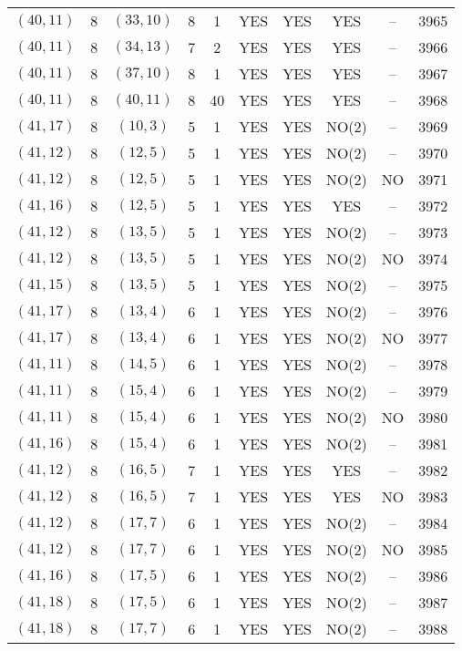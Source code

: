 \begin{longtable}{|c|c|c|c|c|c|c|c|c|c|}
$(40, 11)$ & 8 & $(33, 10)$ & 8 & 1 & YES & YES & YES & -- & 3965\\
$(40, 11)$ & 8 & $(34, 13)$ & 7 & 2 & YES & YES & YES & -- & 3966\\
$(40, 11)$ & 8 & $(37, 10)$ & 8 & 1 & YES & YES & YES & -- & 3967\\
$(40, 11)$ & 8 & $(40, 11)$ & 8 & 40 & YES & YES & YES & -- & 3968\\
$(41, 17)$ & 8 & $(10, 3)$ & 5 & 1 & YES & YES & NO(2) & -- & 3969\\
$(41, 12)$ & 8 & $(12, 5)$ & 5 & 1 & YES & YES & NO(2) & -- & 3970\\
$(41, 12)$ & 8 & $(12, 5)$ & 5 & 1 & YES & YES & NO(2) & NO & 3971\\
$(41, 16)$ & 8 & $(12, 5)$ & 5 & 1 & YES & YES & YES & -- & 3972\\
$(41, 12)$ & 8 & $(13, 5)$ & 5 & 1 & YES & YES & NO(2) & -- & 3973\\
$(41, 12)$ & 8 & $(13, 5)$ & 5 & 1 & YES & YES & NO(2) & NO & 3974\\
$(41, 15)$ & 8 & $(13, 5)$ & 5 & 1 & YES & YES & NO(2) & -- & 3975\\
$(41, 17)$ & 8 & $(13, 4)$ & 6 & 1 & YES & YES & NO(2) & -- & 3976\\
$(41, 17)$ & 8 & $(13, 4)$ & 6 & 1 & YES & YES & NO(2) & NO & 3977\\
$(41, 11)$ & 8 & $(14, 5)$ & 6 & 1 & YES & YES & NO(2) & -- & 3978\\
$(41, 11)$ & 8 & $(15, 4)$ & 6 & 1 & YES & YES & NO(2) & -- & 3979\\
$(41, 11)$ & 8 & $(15, 4)$ & 6 & 1 & YES & YES & NO(2) & NO & 3980\\
$(41, 16)$ & 8 & $(15, 4)$ & 6 & 1 & YES & YES & NO(2) & -- & 3981\\
$(41, 12)$ & 8 & $(16, 5)$ & 7 & 1 & YES & YES & YES & -- & 3982\\
$(41, 12)$ & 8 & $(16, 5)$ & 7 & 1 & YES & YES & YES & NO & 3983\\
$(41, 12)$ & 8 & $(17, 7)$ & 6 & 1 & YES & YES & NO(2) & -- & 3984\\
$(41, 12)$ & 8 & $(17, 7)$ & 6 & 1 & YES & YES & NO(2) & NO & 3985\\
$(41, 16)$ & 8 & $(17, 5)$ & 6 & 1 & YES & YES & NO(2) & -- & 3986\\
$(41, 18)$ & 8 & $(17, 5)$ & 6 & 1 & YES & YES & NO(2) & -- & 3987\\
$(41, 18)$ & 8 & $(17, 7)$ & 6 & 1 & YES & YES & NO(2) & -- & 3988\\

\end{longtable}

